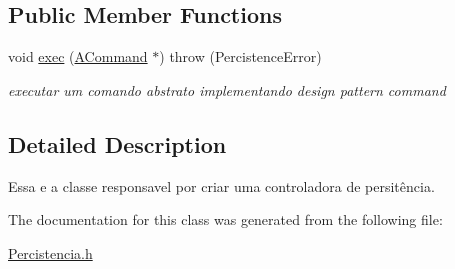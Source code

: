 \subsection*{Public Member Functions}
\begin{DoxyCompactItemize}
\item 
\hypertarget{class_persistence_controler_a76a9674e2af211b12c06c278a38b969e}{void \hyperlink{class_persistence_controler_a76a9674e2af211b12c06c278a38b969e}{exec} (\hyperlink{class_a_command}{A\-Command} $\ast$)  throw (\-Percistence\-Error)}\label{class_persistence_controler_a76a9674e2af211b12c06c278a38b969e}

\begin{DoxyCompactList}\small\item\em executar um comando abstrato implementando design pattern command \end{DoxyCompactList}\end{DoxyCompactItemize}


\subsection{Detailed Description}
Essa e a classe responsavel por criar uma controladora de persitência. 

The documentation for this class was generated from the following file\-:\begin{DoxyCompactItemize}
\item 
\hyperlink{_percistencia_8h}{Percistencia.\-h}\end{DoxyCompactItemize}
